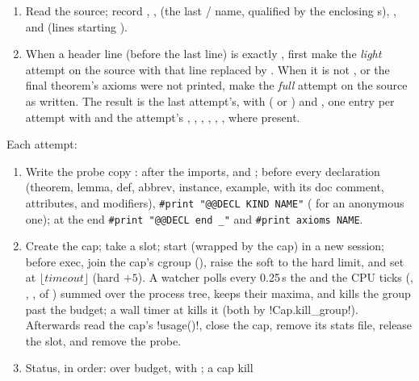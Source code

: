 \begin{algorithm}\label{alg:bench-lean-check}
\begin{enumerate}
\item Read the source; record , ,  (the
  last / name, qualified by the enclosing s),
  , and  (lines starting ).
\item When a header line (before the last  line) is exactly , first make the \emph{light} attempt on the source with that line replaced by
  . When it is not , or the final theorem's axioms
  were not printed, make the \emph{full} attempt on the source as written. The result is the last
  attempt's, with  ( or ) and , one
  entry per attempt with  and the attempt's , ,
  , , , ,
   where present.
\end{enumerate}
Each attempt:
\begin{enumerate}
\item Write the probe copy : after the imports,  and ; before every declaration (theorem, lemma, def,
  abbrev, instance, example, with its doc comment, attributes, and modifiers),
  \texttt{\#print "@@DECL KIND NAME"} (\code{_} for an anonymous one); at the end \texttt{\#print "@@DECL end \_"} and \texttt{\#print axioms NAME}.
\item Create the cap; take a slot; start  (wrapped by the cap) in a
  new session; before exec, join the cap's cgroup (), raise the soft
   to the hard limit, and set  at
  $\lfloor\mathit{timeout}\rfloor$ (hard $+5$). A watcher polls every 0.25\,s the
   and the CPU ticks (, , ,  of
  ) summed over the process tree, keeps their maxima, and kills the group
  past the budget; a wall timer at  kills it (both by \py!Cap.kill_group!).
  Afterwards read the cap's \py!usage()!, close the cap, remove its stats file, release the
  slot, and remove the probe.
\item Status, in order: over budget,  with ; a cap kill

\end{enumerate}
\end{algorithm}
